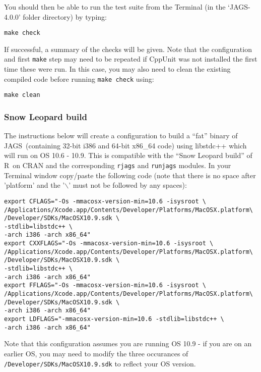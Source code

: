 \documentclass[11pt, a4paper, titlepage]{article}
\newcommand{\release}{4.0.0}
\newcommand{\JAGS}{\textsf{JAGS}}
\newcommand{\R}{\textsf{R}}
\newcommand{\file}[1]{{`\normalfont\textsf{#1}'}}
\begin{document}
You should then be able to run the test suite from the Terminal 
(in the \file{JAGS-\release} folder directory) by typing:

\begin{verbatim} 
make check
\end{verbatim} 

If successful, a summary of the checks will be given.  Note that the configuration and
first \texttt{make} step may need to be repeated if CppUnit was not installed the first
time these were run.  In this case, you may also need to clean the existing 
compiled code before running \texttt{make check} using:

\begin{verbatim} 
make clean
\end{verbatim} 


\subsubsection{Snow Leopard build}

The instructions below will
create a configuration to build a ``fat'' binary of \JAGS\ (containing
32-bit i386 and 64-bit x86\_64 code) using libstdc++ which will run on
OS 10.6 - 10.9.  This is compatible with the ``Snow Leopard build'' of
\R\ on CRAN and the corresponding \texttt{rjags} and \texttt{runjags} modules. 
In your Terminal window copy/paste the following code (note that there is no
space after 'platform' and the '$\backslash$' must not be followed by
any spaces): 

\begin{verbatim}
export CFLAGS="-Os -mmacosx-version-min=10.6 -isysroot \
/Applications/Xcode.app/Contents/Developer/Platforms/MacOSX.platform\
/Developer/SDKs/MacOSX10.9.sdk \
-stdlib=libstdc++ \
-arch i386 -arch x86_64"
export CXXFLAGS="-Os -mmacosx-version-min=10.6 -isysroot \
/Applications/Xcode.app/Contents/Developer/Platforms/MacOSX.platform\
/Developer/SDKs/MacOSX10.9.sdk \
-stdlib=libstdc++ \
-arch i386 -arch x86_64"
export FFLAGS="-Os -mmacosx-version-min=10.6 -isysroot \
/Applications/Xcode.app/Contents/Developer/Platforms/MacOSX.platform\
/Developer/SDKs/MacOSX10.9.sdk \
-arch i386 -arch x86_64"
export LDFLAGS="-mmacosx-version-min=10.6 -stdlib=libstdc++ \
-arch i386 -arch x86_64"
\end{verbatim}

Note that this configuration assumes you are running OS 10.9 - if you 
are on an earlier OS, you may need to modify the three occurances of 
\texttt{/Developer/SDKs/MacOSX10.9.sdk} to reflect your OS version.
\end{document}
